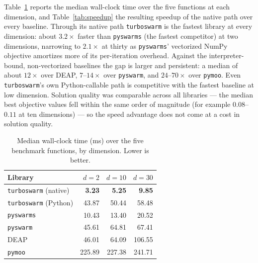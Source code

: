 \documentclass[11pt]{article}
\begin{document}
Table~\ref{tab:time} reports the median wall-clock time over the five functions
at each dimension, and Table~\ref{tab:speedup} the resulting speedup of the
native path over every baseline. Through its native path \texttt{turboswarm} is
the fastest library at every dimension: about $3.2\times$ faster than
\texttt{pyswarms} (the fastest competitor) at two dimensions, narrowing to
$2.1\times$ at thirty as \texttt{pyswarms}' vectorized NumPy objective amortizes
more of its per-iteration overhead. Against the interpreter-bound,
non-vectorized baselines the gap is larger and persistent: a median of about
$12\times$ over DEAP, $7$--$14\times$ over \texttt{pyswarm}, and $24$--$70\times$
over \texttt{pymoo}. Even \texttt{turboswarm}'s own Python-callable path is
competitive with the fastest baseline at low dimension. Solution quality was
comparable across all libraries --- the median best objective values fell within
the same order of magnitude (for example $0.08$--$0.11$ at ten dimensions) --- so
the speed advantage does not come at a cost in solution quality.

\begin{table}[ht]
  \centering
  \caption{Median wall-clock time (ms) over the five benchmark functions, by
  dimension. Lower is better.}
  \label{tab:time}
  \begin{tabular}{lrrr}
    \toprule
    Library & $d=2$ & $d=10$ & $d=30$ \\
    \midrule
    \texttt{turboswarm} (native) & \textbf{3.23} & \textbf{5.25} & \textbf{9.85} \\
    \texttt{turboswarm} (Python) & 43.87 & 50.44 & 58.48 \\
    \texttt{pyswarms}            & 10.43 & 13.40 & 20.52 \\
    \texttt{pyswarm}             & 45.61 & 64.81 & 67.41 \\
    DEAP                         & 46.01 & 64.09 & 106.55 \\
    \texttt{pymoo}               & 225.89 & 227.38 & 241.71 \\
    \bottomrule
  \end{tabular}
\end{table}
\end{document}
